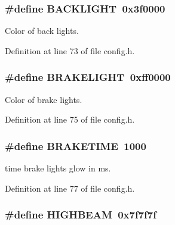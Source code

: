 \subsubsection[{\texorpdfstring{B\+A\+C\+K\+L\+I\+G\+HT}{BACKLIGHT}}]{\setlength{\rightskip}{0pt plus 5cm}\#define B\+A\+C\+K\+L\+I\+G\+HT~0x3f0000}\hypertarget{group__car_gae97ccf06dd29b2a0500f378068b678e2}{}\label{group__car_gae97ccf06dd29b2a0500f378068b678e2}


Color of back lights. 



Definition at line 73 of file config.\+h.

\subsubsection[{\texorpdfstring{B\+R\+A\+K\+E\+L\+I\+G\+HT}{BRAKELIGHT}}]{\setlength{\rightskip}{0pt plus 5cm}\#define B\+R\+A\+K\+E\+L\+I\+G\+HT~0xff0000}\hypertarget{group__car_ga95743a8e9ccb3be5a627dd9322806751}{}\label{group__car_ga95743a8e9ccb3be5a627dd9322806751}


Color of brake lights. 



Definition at line 75 of file config.\+h.

\subsubsection[{\texorpdfstring{B\+R\+A\+K\+E\+T\+I\+ME}{BRAKETIME}}]{\setlength{\rightskip}{0pt plus 5cm}\#define B\+R\+A\+K\+E\+T\+I\+ME~1000}\hypertarget{group__car_gadbd34b4269ed16bd87a0d13cb17bdf81}{}\label{group__car_gadbd34b4269ed16bd87a0d13cb17bdf81}


time brake lights glow in ms. 



Definition at line 77 of file config.\+h.

\subsubsection[{\texorpdfstring{H\+I\+G\+H\+B\+E\+AM}{HIGHBEAM}}]{\setlength{\rightskip}{0pt plus 5cm}\#define H\+I\+G\+H\+B\+E\+AM~0x7f7f7f}\hypertarget{group__car_ga3f561f12573270e4b5329bc5930ad20f}{}\label{group__car_ga3f561f12573270e4b5329bc5930ad20f}


